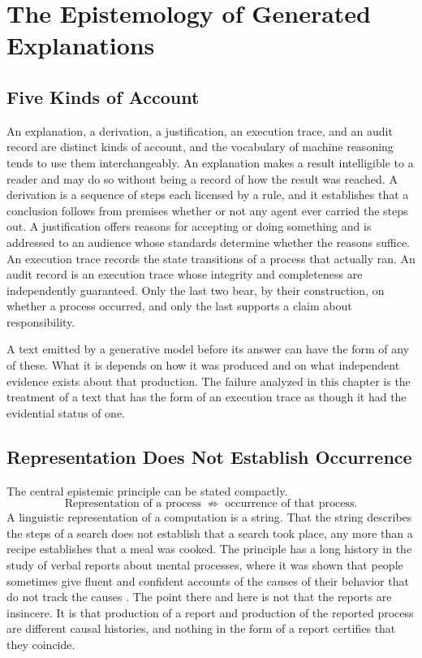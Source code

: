 \chapter{The Epistemology of Generated Explanations}
\label{ch:epistemology}

\section{Five Kinds of Account}

An explanation, a derivation, a justification, an execution trace, and an audit record are distinct kinds of account, and the vocabulary of machine reasoning tends to use them interchangeably. An explanation makes a result intelligible to a reader and may do so without being a record of how the result was reached. A derivation is a sequence of steps each licensed by a rule, and it establishes that a conclusion follows from premises whether or not any agent ever carried the steps out. A justification offers reasons for accepting or doing something and is addressed to an audience whose standards determine whether the reasons suffice. An execution trace records the state transitions of a process that actually ran. An audit record is an execution trace whose integrity and completeness are independently guaranteed. Only the last two bear, by their construction, on whether a process occurred, and only the last supports a claim about responsibility.

A text emitted by a generative model before its answer can have the form of any of these. What it is depends on how it was produced and on what independent evidence exists about that production. The failure analyzed in this chapter is the treatment of a text that has the form of an execution trace as though it had the evidential status of one.

\section{Representation Does Not Establish Occurrence}

The central epistemic principle can be stated compactly.
\[
\text{Representation of a process} \;\not\Rightarrow\; \text{occurrence of that process}.
\]
A linguistic representation of a computation is a string. That the string describes the steps of a search does not establish that a search took place, any more than a recipe establishes that a meal was cooked. The principle has a long history in the study of verbal reports about mental processes, where it was shown that people sometimes give fluent and confident accounts of the causes of their behavior that do not track the causes \cite{nisbett1977}. The point there and here is not that the reports are insincere. It is that production of a report and production of the reported process are different causal histories, and nothing in the form of a report certifies that they coincide.

